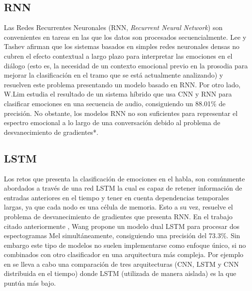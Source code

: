 \documentclass[11pt,a4paper,spanish]{book}
\begin{document}
	\subsection{RNN}
	 Las Redes Recurrentes Neuronales (RNN, \emph{Recurrent Neural Network}) son convenientes en tareas en las que los datos son procesados secuencialmente.
	Lee y Tashev \cite{Lee2015} afirman que los sistemas basados en simples redes neuronales densas no cubren el efecto contextual a largo plazo para interpretar las emociones en el diálogo (esto es, la necesidad de un contexto emocional previo en la prosodia para mejorar la clasificación en el tramo que se está actualmente analizando) y resuelven este problema presentando un modelo basado en RNN. Por otro lado, W.Lim \cite{Lim2017} estudia el resultado de un sistema híbrido que usa CNN y RNN para clasificar emociones en una secuencia de audio, consiguiendo un 88.01\% de precisión.
	No obstante, los modelos RNN no son suficientes para representar el espectro emocional a lo largo de una conversación debido al problema de desvanecimiento de gradientes*.
	
	\subsection{LSTM}
	Los retos que presenta la clasificación de emociones en el habla, son comúnmente abordados a través de una red LSTM la cual es capaz de retener información de entradas anteriores en el tiempo y tener en cuenta dependencias temporales largas, ya que cada nodo es una célula de memoria. Esto a su vez, resuelve el problema de desvanecimiento de gradientes que presenta RNN.
	En el trabajo citado anteriormente \cite{Wang2020}, Wang propone un modelo dual LSTM para procesar dos espectogramas Mel simultáneamente, consiguiendo una precisión del 73.3\%. 
	Sin embargo este tipo de modelos no suelen implementarse como enfoque único, si no combinados con otro clasificador en una arquitectura más compleja. Por ejemplo en \cite{Lim2017} se lleva a cabo una comparación de tres  arquitecturas (CNN, LSTM y CNN distribuida en el tiempo) donde LSTM (utilizada de manera aislada) es la que puntúa más bajo.
	
\end{document}
